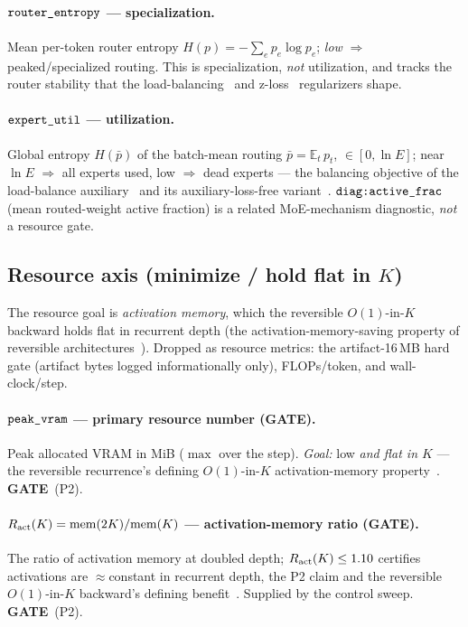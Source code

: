 \documentclass[11pt]{article}
\newcommand{\E}{\mathbb{E}}
\newcommand{\code}[1]{\texttt{#1}}
\newcommand{\GATE}{\textcolor{gate}{\textbf{GATE}}}
\begin{document}
\paragraph{\(\code{\detokenize{router_entropy}}\) --- specialization.}
Mean per-token router entropy \(H(p)=-\sum_e p_e\log p_e\); \emph{low} \(\Rightarrow\) peaked/specialized
routing.  This is specialization, \emph{not} utilization, and tracks the router stability that the
load-balancing~\cite{switch} and z-loss~\cite{stmoe} regularizers shape.

\paragraph{\(\code{\detokenize{expert_util}}\) --- utilization.}
Global entropy \(H(\bar p)\) of the batch-mean routing \(\bar p=\E_t\,p_t\), \(\in[0,\ln E]\); near
\(\ln E\) \(\Rightarrow\) all experts used, low \(\Rightarrow\) dead experts --- the balancing objective
of the load-balance auxiliary~\cite{switch} and its auxiliary-loss-free variant~\cite{deepseekv3}.
\(\code{\detokenize{diag:active_frac}}\)
(mean routed-weight active fraction) is a related MoE-mechanism diagnostic, \emph{not} a resource gate.

\subsection{Resource axis (minimize / hold flat in \texorpdfstring{$K$}{K})}
\label{ssec:resource}
The resource goal is \emph{activation memory}, which the reversible \(O(1)\)-in-\(K\) backward holds
flat in recurrent depth (the activation-memory-saving property of reversible
architectures~\cite{revnet,reformer,revffn,melt}).  Dropped as resource metrics: the artifact-16\,MB hard gate (artifact bytes
logged informationally only), FLOPs/token, and wall-clock/step.

\paragraph{\(\code{\detokenize{peak_vram}}\) --- primary resource number (\GATE).}
Peak allocated VRAM in MiB (\(\max\) over the step).  \emph{Goal:} low \emph{and flat in \(K\)} --- the
reversible recurrence's defining \(O(1)\)-in-\(K\) activation-memory property~\cite{revnet,reformer,revffn,melt}.  \GATE\ (P2).

\paragraph{\(R_{\rm act}(K)=\mathrm{mem}(2K)/\mathrm{mem}(K)\) --- activation-memory ratio (\GATE).}
The ratio of activation memory at doubled depth; \(R_{\rm act}(K)\le1.10\) certifies activations are
\(\approx\)constant in recurrent depth, the P2 claim and the reversible \(O(1)\)-in-\(K\) backward's
defining benefit~\cite{revnet,reformer,revffn,melt}.  Supplied by the control sweep.  \GATE\ (P2).
\end{document}
